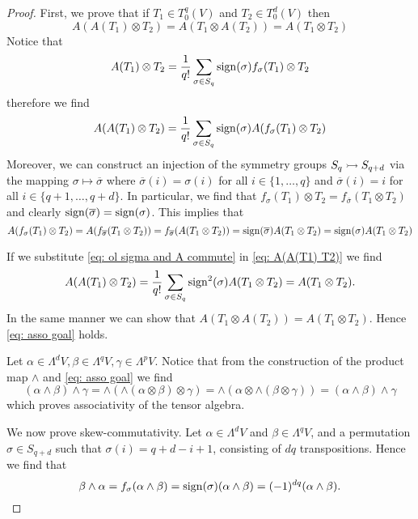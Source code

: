 \begin{proof}
First, we prove that if \(T_1 \in T_0^q(V)\) and \(T_2 \in T_0^d(V)\) then
\begin{equation}\label{eq: asso goal}
  A(A(T_1) \otimes T_2) = A(T_1 \otimes A(T_2)) =
  A(T_1 \otimes T_2)
\end{equation} Notice that \[
  A(T_1) \otimes T_2 = \frac 1 {q!} \sum_{\sigma \in S_q}
  \operatorname{sign}(\sigma) f_\sigma(T_1) \otimes T_2
\]
therefore we find
\begin{equation}\label{eq: A(A(T1) T2)}
  A(A(T_1) \otimes T_2) = \frac 1 {q!} \sum_{\sigma \in S_q}
  \operatorname{sign}(\sigma) A(f_\sigma(T_1) \otimes T_2)
\end{equation}
Moreover, we can construct an injection of the symmetry groups \(S_q
\rightarrowtail S_{q + d}\) via the mapping \(\sigma \mapsto \overline \sigma\)
where \(\overline \sigma(i) = \sigma(i)\) for all \(i \in \{1, \dots, q\}\)
and \(\overline \sigma(i) = i\) for all \(i \in \{q + 1, \dots, q + d\}\). In
particular, we find that \(f_\sigma(T_1) \otimes T_2 = f_{\overline \sigma}
(T_1 \otimes T_2)\) and clearly \(\operatorname{sign}(\overline \sigma) = \operatorname{sign}(\sigma)\).
This implies that
\begin{equation}\label{eq: ol sigma and A commute}
  A(f_\sigma(T_1) \otimes T_2) = A(f_{\overline \sigma}(T_1 \otimes T_2))
  = f_{\overline \sigma}(A(T_1 \otimes T_2))
  = \operatorname{sign}(\overline \sigma) A(T_1 \otimes T_2)
  = \operatorname{sign}(\sigma) A(T_1 \otimes T_2)
\end{equation}

If we substitute \cref{eq: ol sigma and A commute} in \cref{eq: A(A(T1) T2)}
we find
\[
  A(A(T_1) \otimes T_2) = \frac 1 {q!} \sum_{\sigma \in S_q}
  \operatorname{sign}^2(\sigma) A(T_1 \otimes T_2) = A(T_1 \otimes T_2).
\]
In the same manner we can show that \(A(T_1 \otimes A(T_2)) = A(T_1 \otimes
T_2)\). Hence \cref{eq: asso goal} holds.

Let \(\alpha \in \Lambda^d V, \beta \in \Lambda^q V, \gamma \in \Lambda^p V\).
Notice that from the construction of the product map \(\wedge\) and \cref{eq:
asso goal} we find
\[
  (\alpha \wedge \beta) \wedge \gamma
  = \wedge\left( \wedge(\alpha \otimes \beta) \otimes \gamma \right)
  = \wedge\left(\alpha \otimes \wedge(\beta \otimes \gamma) \right)
  = (\alpha \wedge \beta) \wedge \gamma
\]
which proves associativity of the tensor algebra.

We now prove skew-commutativity. Let \(\alpha \in \Lambda^d V\) and \(\beta
\in \Lambda^q V\), and a permutation \(\sigma \in S_{q + d}\) such
that \(\sigma(i) = q + d - i + 1\), consisting of \(d q\) transpositions.
Hence we find that
\[
  \beta \wedge \alpha = f_\sigma(\alpha \wedge \beta)
  = \operatorname{sign}(\sigma)(\alpha \wedge \beta) = (-1)^{d q} (\alpha \wedge \beta).
\]
\end{proof}


